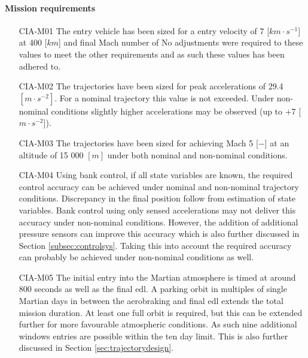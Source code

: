 \paragraph{Mission requirements}
\begin{itemize}[leftmargin=+20mm]
\item[CIA-M01]	The entry vehicle has been sized for a entry velocity of 7 [$km \cdot s^{-1}$] at 400 [$km$] and final Mach number of  No adjustments were required to these values to meet the other requirements and as such these values has been adhered to. 
\item[CIA-M02]	The trajectories have been sized for peak accelerations of 29.4 $[m \cdot s^{-2}]$. For a nominal trajectory this value is not exceeded. Under non-nominal conditions slightly higher accelerations may be observed (up to +7 [$m \cdot s ^{-2}$]). 
\item[CIA-M03]  The trajectories have been sized for achieving Mach 5 [$-$] at an altitude of 15 000 $\left[m\right]$ under both nominal and non-nominal conditions.
\item[CIA-M04]	Using bank control, if all state variables are known, the required control accuracy can be achieved under nominal and non-nominal trajectory conditions. Discrepancy in the final position follow from estimation of state variables. Bank control using only sensed accelerations may not deliver this accuracy under non-nominal conditions. However, the addition of additional pressure sensors can improve this accuracy which is also further discussed in Section \ref{subsec:controlsys}. Taking this into account the required accuracy can probably be achieved under non-nominal conditions as well.
\item[CIA-M05] The initial entry into the Martian atmosphere is timed at around 800 seconds as well as the final \gls{edl}. A parking orbit in multiples of single Martian days in between the aerobraking and final \gls{edl} extends the total mission duration. At least one full orbit is required, but this can be extended further for more favourable atmospheric conditions. As such nine additional windows entries are possible within the ten day limit. This is also further discussed  in Section \ref{sec:trajectorydesign}.

\end{itemize}



